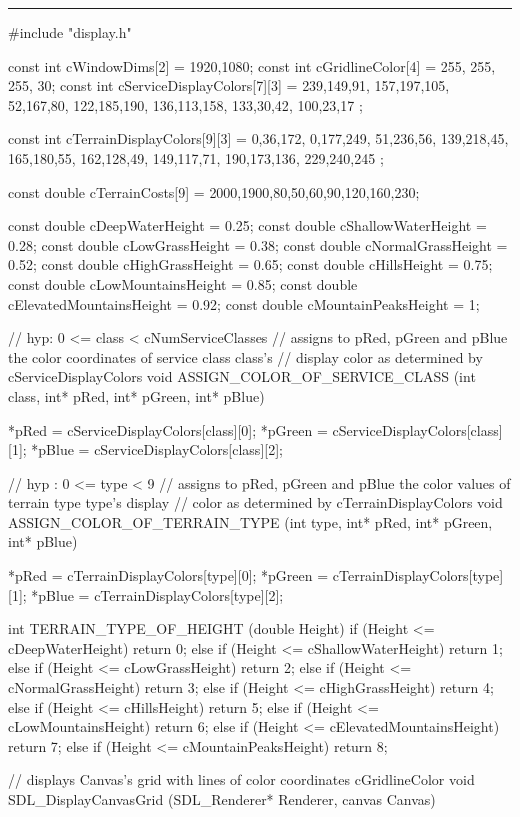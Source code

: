 \hrule
\begin{C}
#include "display.h"

const int cWindowDims[2] = {1920,1080};
const int cGridlineColor[4] = {255, 255, 255, 30};
const int cServiceDisplayColors[7][3] = {
	{239,149,91},
	{157,197,105},
	{52,167,80},
	{122,185,190},
	{136,113,158},
	{133,30,42},
	{100,23,17}
};


const int cTerrainDisplayColors[9][3] = {
	{0,36,172},
	{0,177,249},
	{51,236,56},
	{139,218,45},
	{165,180,55},
	{162,128,49},
	{149,117,71},
	{190,173,136},
	{229,240,245}
};

const double cTerrainCosts[9] = {2000,1900,80,50,60,90,120,160,230};

const double cDeepWaterHeight = 0.25;
const double cShallowWaterHeight = 0.28;
const double cLowGrassHeight = 0.38;
const double cNormalGrassHeight = 0.52;
const double cHighGrassHeight = 0.65;
const double cHillsHeight = 0.75;
const double cLowMountainsHeight = 0.85;
const double cElevatedMountainsHeight = 0.92;
const double cMountainPeaksHeight = 1;

// hyp: 0 <= class < cNumServiceClasses
// assigns to pRed, pGreen and pBlue the color coordinates of service class class's
// display color as determined by cServiceDisplayColors
void ASSIGN_COLOR_OF_SERVICE_CLASS (int class, int* pRed, int* pGreen, int* pBlue){
	
	*pRed = cServiceDisplayColors[class][0];
	*pGreen = cServiceDisplayColors[class][1];
	*pBlue = cServiceDisplayColors[class][2];
}


// hyp : 0 <= type < 9
// assigns to pRed, pGreen and pBlue the color values of terrain type type's display
// color as determined by cTerrainDisplayColors
void ASSIGN_COLOR_OF_TERRAIN_TYPE (int type, int* pRed, int* pGreen, int* pBlue){
	
	*pRed = cTerrainDisplayColors[type][0];
	*pGreen = cTerrainDisplayColors[type][1];
	*pBlue = cTerrainDisplayColors[type][2];
}


int TERRAIN_TYPE_OF_HEIGHT (double Height){
	if (Height <= cDeepWaterHeight) return 0;
	else if (Height <= cShallowWaterHeight) return 1;
	else if (Height <= cLowGrassHeight) return 2;
	else if (Height <= cNormalGrassHeight) return 3;
	else if (Height <= cHighGrassHeight) return 4;
	else if (Height <= cHillsHeight) return 5;
	else if (Height <= cLowMountainsHeight) return 6;
	else if (Height <= cElevatedMountainsHeight) return 7;
	else if (Height <= cMountainPeaksHeight) return 8;
}


// displays Canvas's grid with lines of color coordinates cGridlineColor
void SDL_DisplayCanvasGrid (SDL_Renderer* Renderer, canvas Canvas){
	
}
\end{C}
